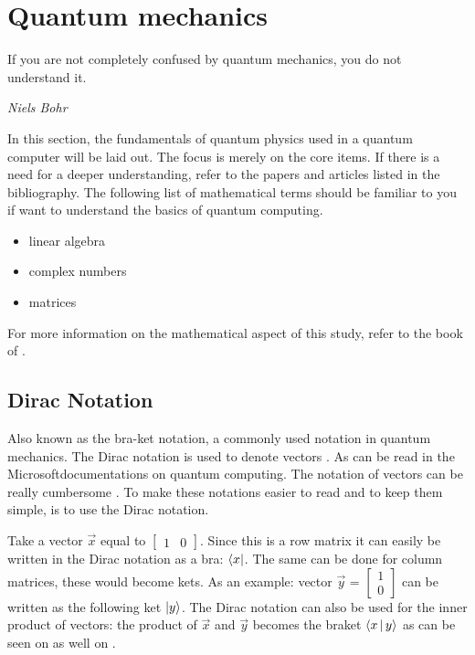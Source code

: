 \section{Quantum mechanics} \label{quantum mechanics}
\epigraph{If you are not completely confused by quantum mechanics, you do not understand it.}{\textit{Niels Bohr}}

In this section, the fundamentals of quantum physics used in a quantum computer will be laid out.
The focus is merely on the core items. If there is a need for a deeper understanding, refer to the papers and articles listed in the bibliography.
The following list of mathematical terms should be familiar to you if want to understand the basics of quantum computing.

\begin{itemize}
    \item linear algebra
    \item complex numbers
    \item matrices
\end{itemize}

For more information on the mathematical aspect of this study, refer to the book of \textcite{bernhardt_2019}.

\subsection{Dirac Notation} \label{Dirac}
Also known as the bra-ket notation, a commonly used notation in quantum mechanics. The Dirac notation is used to denote vectors \autocite{Dirac_Notation2020}.
As can be read in the Microsoft\textregistered  documentations on quantum computing. The notation of vectors can be really cumbersome \autocite{Microsoft_Dirac}. To make these notations easier to read and to keep them simple, is to use the Dirac notation.

Take a vector $\vec{x}$ equal to $\begin{bmatrix}
    1 & 0 
\end{bmatrix}$.
Since this is a row matrix it can easily be written in the Dirac notation as a bra: $\bra{x}$. The same can be done for column matrices, these would become kets. As an example:
vector $\vec{y}$ = $\begin{bmatrix}
    1 \\
    0
\end{bmatrix}$ can be written as the following ket $\ket{y}$.
The Dirac notation can also be used for the inner product of vectors: the product of $\vec{x}$ and $\vec{y}$ becomes the braket $\Braket{x|y}$ as can be seen on \textcite{Dirac_Notation2020} as well on \textcite{Microsoft_Dirac}.


